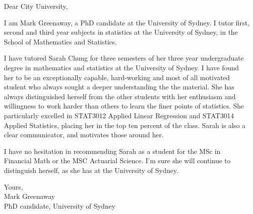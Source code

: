 \documentclass{letter}
\begin{document}
Dear City University,

I am Mark Greenaway, a PhD candidate at the University of Sydney. I tutor first, second and third year
subjects in statistics at the University of Sydney, in the School of Mathematics and Statistics.

I have tutored Sarah Chung for three semesters of her three year undergraduate degree in mathematics and
statistics at the University of Sydney. I have found her to be an exceptionally capable, hard-working and most
of all motivated student who always sought a deeper understanding the the material. She has always
distinguished herself from the other students with her enthusiasm and willingness to work harder than others
to learn the finer points of statistics. She particularly excelled in STAT3012 Applied Linear Regression and
STAT3014 Applied Statistics, placing her in the top ten percent of the class. Sarah is also a clear
communicator, and motivates those around her.

I have no hesitation in recommending Sarah as a student for the MSc in Financial Math or the MSC Actuarial
Science. I'm sure she will continue to distinguish herself, as she has at the University of Sydney.

Yours, \\
Mark Greenaway \\
PhD candidate, University of Sydney
\end{document}
